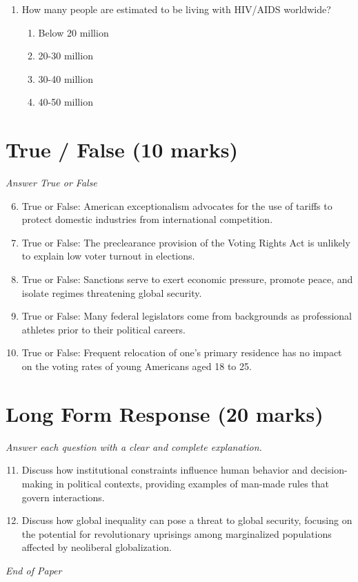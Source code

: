 \documentclass[12pt]{article}
\begin{document}
\begin{enumerate}[label=\arabic*.]
\begin{enumerate}[label=(\alph*)]
    \item They serve American interests
    \item The US is incapable of acting alone
    \item None of the above
\end{enumerate}
\item How many people are estimated to be living with HIV/AIDS worldwide?
\begin{enumerate}[label=(\alph*)]
    \item Below 20 million
    \item 20-30 million
    \item 30-40 million
    \item 40-50 million
\end{enumerate}
\end{enumerate}

\section*{True / False (10 marks)}
\textit{Answer True or False}
\begin{enumerate}[label=\arabic*.]
\setcounter{enumi}{5}
\item True or False: American exceptionalism advocates for the use of tariffs to protect domestic industries from international competition.
\item True or False: The preclearance provision of the Voting Rights Act is unlikely to explain low voter turnout in elections.
\item True or False: Sanctions serve to exert economic pressure, promote peace, and isolate regimes threatening global security.
\item True or False: Many federal legislators come from backgrounds as professional athletes prior to their political careers.
\item True or False: Frequent relocation of one's primary residence has no impact on the voting rates of young Americans aged 18 to 25.
\end{enumerate}

\section*{Long Form Response (20 marks)}
\textit{Answer each question with a clear and complete explanation.}
\begin{enumerate}[label=\arabic*.]
\setcounter{enumi}{10}
\item Discuss how institutional constraints influence human behavior and decision-making in political contexts, providing examples of man-made rules that govern interactions.
\item Discuss how global inequality can pose a threat to global security, focusing on the potential for revolutionary uprisings among marginalized populations affected by neoliberal globalization.
\end{enumerate}

\vfill
\noindent\textit{End of Paper}
\end{document}
